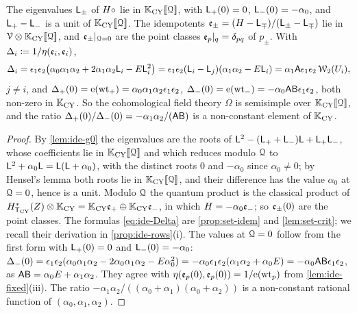 \begin{lem}[Semisimplicity at $\cQ=0$]
\label{lem:ide-ss}
The eigenvalues $\mathsf{L}_\pm$ of $H\circ$ lie in $\mathbb{K}_{\mathrm{CY}}[\![ \mathcal{Q} ]\!]$, with $\mathsf{L}_+(0)=0$, $\mathsf{L}_-(0)=-\alpha_0$, and $\mathsf{L}_+-\mathsf{L}_-$ is a unit of $\mathbb{K}_{\mathrm{CY}}[\![ \mathcal{Q} ]\!]$. The idempotents $\mathfrak{e}_\pm=(H-\mathsf{L}_\mp)/(\mathsf{L}_\pm-\mathsf{L}_\mp)$ lie in $\mathcal{V}\otimes\mathbb{K}_{\mathrm{CY}}[\![ \mathcal{Q} ]\!]$, and $\mathfrak{e}_\pm|_{\mathcal{Q}=0}$ are the point classes $\mathfrak{e}_p|_q=\delta_{pq}$ of $p_\pm$. With $\Delta_i\coloneqq 1/\eta(\mathfrak{e}_i,\mathfrak{e}_i)$,
\begin{equation}
\label{eq:ide-Delta}
\Delta_i=\epsilon_1\epsilon_2\big(\alpha_0\alpha_1\alpha_2+2\alpha_1\alpha_2\mathsf{L}_i-E\mathsf{L}_i^2\big)=\epsilon_1\epsilon_2(\mathsf{L}_i-\mathsf{L}_j)(\alpha_1\alpha_2-E\mathsf{L}_i)
=\alpha_1\mathsf{A}\epsilon_1\epsilon_2\,\mathcal{W}_2(U_i),
\end{equation}
$j\neq i$, and $\Delta_+(0)=\mathrm{e}(\mathrm{wt}_+)=\alpha_0\alpha_1\alpha_2\epsilon_1\epsilon_2$, $\Delta_-(0)=\mathrm{e}(\mathrm{wt}_-)=-\alpha_0\mathsf{A}\mathsf{B}\epsilon_1\epsilon_2$, both non-zero in $\mathbb{K}_{\mathrm{CY}}$. So the cohomological field theory $\Omega$ is semisimple over $\mathbb{K}_{\mathrm{CY}}[\![ \mathcal{Q} ]\!]$, and the ratio $\Delta_+(0)/\Delta_-(0)=-\alpha_1\alpha_2/(\mathsf{A}\mathsf{B})$ is a non-constant element of $\mathbb{K}_{\mathrm{CY}}$.
\end{lem}
\begin{proof}
By \cref{lem:ide-g0} the eigenvalues are the roots of $\mathsf{L}^2-(\mathsf{L}_++\mathsf{L}_-)\mathsf{L}+\mathsf{L}_+\mathsf{L}_-$, whose coefficients lie in $\mathbb{K}_{\mathrm{CY}}[\![ \mathcal{Q} ]\!]$ and which reduces modulo $\mathcal{Q}$ to $\mathsf{L}^2+\alpha_0\mathsf{L}=\mathsf{L}(\mathsf{L}+\alpha_0)$, with the distinct roots $0$ and $-\alpha_0$ since $\alpha_0\neq 0$; by Hensel's lemma both roots lie in $\mathbb{K}_{\mathrm{CY}}[\![ \mathcal{Q} ]\!]$, and their difference has the value $\alpha_0$ at $\cQ=0$, hence is a unit. Modulo $\mathcal{Q}$ the quantum product is the classical product of $H^*_{\mathsf{T}_{\mathrm{CY}}}(Z)\otimes\mathbb{K}_{\mathrm{CY}}=\mathbb{K}_{\mathrm{CY}}\mathfrak{e}_+\oplus\mathbb{K}_{\mathrm{CY}}\mathfrak{e}_-$, in which $H=-\alpha_0\mathfrak{e}_-$; so $\mathfrak{e}_\pm(0)$ are the point classes. The formulas \cref{eq:ide-Delta} are \cref{prop:set-idem} and \cref{lem:set-crit}; we recall their derivation in \cref{prop:ide-rows}(i). The values at $\cQ=0$ follow from the first form with $\mathsf{L}_+(0)=0$ and $\mathsf{L}_-(0)=-\alpha_0$: $\Delta_-(0)=\epsilon_1\epsilon_2(\alpha_0\alpha_1\alpha_2-2\alpha_0\alpha_1\alpha_2-E\alpha_0^2)=-\alpha_0\epsilon_1\epsilon_2(\alpha_1\alpha_2+\alpha_0E)=-\alpha_0\mathsf{A}\mathsf{B}\epsilon_1\epsilon_2$, as $\mathsf{A}\mathsf{B}=\alpha_0E+\alpha_1\alpha_2$. They agree with $\eta(\mathfrak{e}_p(0),\mathfrak{e}_p(0))=1/\mathrm{e}(\mathrm{wt}_p)$ from \cref{lem:ide-fixed}(iii). The ratio $-\alpha_1\alpha_2/((\alpha_0+\alpha_1)(\alpha_0+\alpha_2))$ is a non-constant rational function of $(\alpha_0,\alpha_1,\alpha_2)$.
\end{proof}

